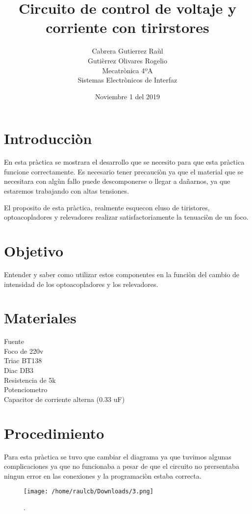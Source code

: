 \documentclass[11pt]{article}
\title{\textbf{Circuito de control de voltaje y corriente con tirirstores}}
\author{Cabrera Gutierrez Raùl 
\\ Gutièrrez Olivares Rogelio
\\Mecatrònica 4ºA
\\Sistemas Electrònicos de Interfaz }
\date{Noviembre 1 del 2019 }
\begin{document}
\maketitle

\section{Introducciòn}
En esta pràctica se mostrara el desarrollo que se necesito para que esta pràctica funcione correctamente. Es necesario tener precauciòn ya que el material que se necesitara con algùn fallo puede descomponerse o llegar a dañarnos, ya que estaremos trabajando con altas tensiones.

El proposito de esta pràctica, realmente esquecon eluso de tiristores, optoacopladores y relevadores realizar satisfactoriamente la tenuaciòn de un foco.
\section{Objetivo}
Entender y saber como utilizar estos componentes en la funciòn del cambio de intensidad de los optoacopladores y los relevadores.
\section{Materiales}
Fuente
\\
Foco de 220v
\\
Triac BT138
\\
Diac DB3
\\
Resistencia de 5k
\\
Potenciometro 
\\
Capacitor de corriente alterna (0.33 uF) 

\section{Procedimiento}

Para esta pràctica se tuvo que cambiar el diagrama ya que tuvimos algunas complicaciones ya que no funcionaba a pesar de que el circuito no prersentaba ningun error en las conexiones y la programaciòn estaba correcta.

\begin{figure}[htp]
\centering
\texttt{[image: /home/raulcb/Downloads/3.png]}
\caption{.}
\label{.}
\end{figure}
\end{document}
